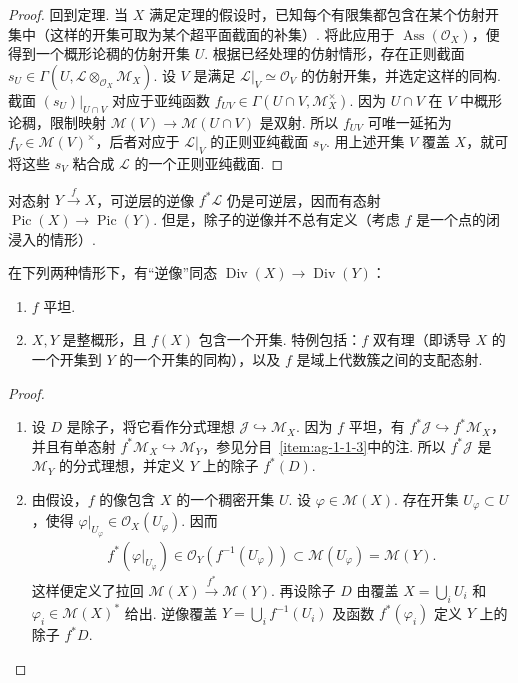 \begin{proof}
回到定理. 当 $X$ 满足定理的假设时，已知每个有限集都包含在某个仿射开集中（这样的开集可取为某个超平面截面的补集）. 将此应用于 $\operatorname{Ass}(\mathcal O_X)$，便得到一个概形论稠的仿射开集 $U$. 根据已经处理的仿射情形，存在正则截面 $s_U\in\Gamma(U,\mathcal L\otimes_{\mathcal O_X}\mathcal M_X)$. 设 $V$ 是满足 $\mathcal L|_V\simeq\mathcal O_V$ 的仿射开集，并选定这样的同构. 截面 $(s_U)|_{U\cap V}$ 对应于亚纯函数 $f_{UV}\in\Gamma(U\cap V,\mathcal M_X^\times)$. 因为 $U\cap V$ 在 $V$ 中概形论稠，限制映射 $\mathcal M(V)\longrightarrow\mathcal M(U\cap V)$ 是双射. 所以 $f_{UV}$ 可唯一延拓为 $f_V\in\mathcal M(V)^\times$，后者对应于 $\mathcal L|_V$ 的正则亚纯截面 $s_V$. 用上述开集 $V$ 覆盖 $X$，就可将这些 $s_V$ 粘合成 $\mathcal L$ 的一个正则亚纯截面.
\end{proof}
\begin{numpara}[函子性]\label{item:ag-1-2-5}
对态射 $Y\xrightarrow f X$，可逆层的逆像 $f^*\mathcal L$ 仍是可逆层，因而有态射 $\operatorname{Pic}(X)\longrightarrow\operatorname{Pic}(Y)$. 但是，除子的逆像并不总有定义（考虑 $f$ 是一个点的闭浸入的情形）.
\end{numpara}
\begin{proposition}\label{item:ag-1-2-6}
在下列两种情形下，有``逆像''同态 $\operatorname{Div}(X)\longrightarrow\operatorname{Div}(Y)$：
\begin{enumerate}[label=\roman*)]
\item $f$ 平坦.
\item $X,Y$ 是整概形，且 $f(X)$ 包含一个开集. 特例包括：$f$ 双有理（即诱导 $X$ 的一个开集到 $Y$ 的一个开集的同构），以及 $f$ 是域上代数簇之间的支配态射.
\end{enumerate}
\end{proposition}
\begin{proof}
\begin{enumerate}[label=\roman*)]
\item 设 $D$ 是除子，将它看作分式理想 $\mathcal J\hookrightarrow\mathcal M_X$. 因为 $f$ 平坦，有 $f^*\mathcal J\hookrightarrow f^*\mathcal M_X$，并且有单态射 $f^*\mathcal M_X\hookrightarrow\mathcal M_Y$，参见分目~\ref{item:ag-1-1-3}中的注. 所以 $f^*\mathcal J$ 是 $\mathcal M_Y$ 的分式理想，并定义 $Y$ 上的除子 $f^*(D)$.
\item 由假设，$f$ 的像包含 $X$ 的一个稠密开集 $U$. 设 $\varphi\in\mathcal M(X)$. 存在开集 $U_\varphi\subset U$，使得 $\varphi|_{U_\varphi}\in\mathcal O_X(U_\varphi)$. 因而
\begin{align*}
f^*(\varphi|_{U_\varphi})\in\mathcal O_Y(f^{-1}(U_\varphi))
\subset\mathcal M(U_\varphi)=\mathcal M(Y).
\end{align*}
这样便定义了拉回 $\mathcal M(X)\xrightarrow{f^*}\mathcal M(Y)$. 再设除子 $D$ 由覆盖 $X=\bigcup_iU_i$ 和 $\varphi_i\in\mathcal M(X)^*$ 给出. 逆像覆盖 $Y=\bigcup_if^{-1}(U_i)$ 及函数 $f^*(\varphi_i)$ 定义 $Y$ 上的除子 $f^*D$.\qedhere
\end{enumerate}
\end{proof}
